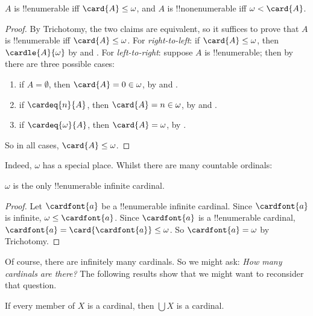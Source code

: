 \documentclass[../../../include/open-logic-section]{subfiles}
\begin{document}
\begin{prop}
$A$ is !!{enumerable} iff $\card{A} \leq \omega$, and $A$ is
!!{nonenumerable} iff $\omega < \card{A}$.
\end{prop}

\begin{proof}
By Trichotomy, the two claims are equivalent, so it suffices to prove
that $A$ is !!{enumerable} iff $\card{A} \leq \omega$. For
\emph{right-to-left}: if $\card{A} \leq \omega$, then
$\cardle{A}{\omega}$ by
 and
. For \emph{left-to-right}: suppose $A$ is
!!{enumerable}; then by  there
are three possible cases:
\begin{enumerate}
	\item if $A = \emptyset$, then $\card{A} = 0 \in \omega$, by
	 and
	.
	\item if $\cardeq{n}{A}$, then $\card{A} = n \in \omega$, by
	 and
	.
	\item if $\cardeq{\omega}{A}$, then $\card{A} = \omega$, by .
\end{enumerate}
So in all cases, $\card{A} \leq \omega$. 
\end{proof}
\noindent
Indeed, $\omega$ has a special place. Whilst there are many countable ordinals:

\begin{cor}
$\omega$ is the only !!{enumerable} infinite cardinal.
\end{cor}

\begin{proof}
Let $\cardfont{a}$ be a !!{enumerable} infinite cardinal. Since
$\cardfont{a}$ is infinite, $\omega \leq \cardfont{a}$. Since
$\cardfont{a}$ is a !!{enumerable} cardinal, $\cardfont{a} =
\card{\cardfont{a}} \leq \omega$. So $\cardfont{a} = \omega$ by
Trichotomy. \end{proof}

Of course, there are infinitely many cardinals. So we might ask:
\emph{How many cardinals are there?} The following results show that
we might want to reconsider that question.

\begin{prop}
If every member of $X$ is a cardinal, then $\bigcup X$ is a cardinal.
\end{prop}
\end{document}
